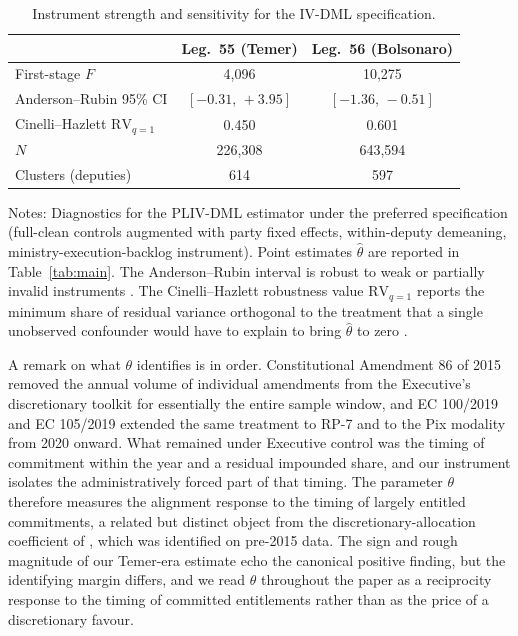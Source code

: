 \documentclass[preprint,12pt,authoryear]{elsarticle}
\begin{document}
\begin{table}[htbp]
\centering
\caption{Instrument strength and sensitivity for the IV-DML specification.}
\label{tab:iv_validation}
\begin{threeparttable}
\small
\setlength{\tabcolsep}{6pt}
\begin{tabular}{@{}lcc@{}}
\toprule
& Leg.~55 (Temer) & Leg.~56 (Bolsonaro) \\
\midrule
First-stage $F$                      & 4{,}096           & 10{,}275          \\
Anderson--Rubin 95\% CI              & $[-0.31,\,+3.95]$ & $[-1.36,\,-0.51]$ \\
Cinelli--Hazlett $\mathrm{RV}_{q=1}$  & 0.450             & 0.601             \\
$N$                                  & 226{,}308          & 643{,}594          \\
Clusters (deputies)                  & 614               & 597               \\
\bottomrule
\end{tabular}
\begin{tablenotes}
\small
\item Notes: Diagnostics for the PLIV-DML estimator under the preferred specification (full-clean controls augmented with party fixed effects, within-deputy demeaning, ministry-execution-backlog instrument). Point estimates $\hat\theta$ are reported in Table~\ref{tab:main}. The Anderson--Rubin interval is robust to weak or partially invalid instruments \citep{AndersonRubin1949}. The Cinelli--Hazlett robustness value $\mathrm{RV}_{q=1}$ reports the minimum share of residual variance orthogonal to the treatment that a single unobserved confounder would have to explain to bring $\hat\theta$ to zero \citep{CinelliHazlett2020}.
\end{tablenotes}
\end{threeparttable}
\end{table}

A remark on what $\theta$ identifies is in order. Constitutional Amendment 86 of 2015 removed the annual volume of individual amendments from the Executive's discretionary toolkit for essentially the entire sample window, and EC 100/2019 and EC 105/2019 extended the same treatment to RP-7 and to the Pix modality from 2020 onward. What remained under Executive control was the timing of commitment within the year and a residual impounded share, and our instrument isolates the administratively forced part of that timing. The parameter $\theta$ therefore measures the alignment response to the timing of largely entitled commitments, a related but distinct object from the discretionary-allocation coefficient of \citet{PereiraAndMueller2004}, which was identified on pre-2015 data. The sign and rough magnitude of our Temer-era estimate echo the canonical positive finding, but the identifying margin differs, and we read $\theta$ throughout the paper as a reciprocity response to the timing of committed entitlements rather than as the price of a discretionary favour.
\end{document}
